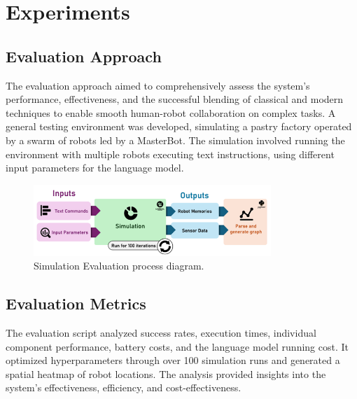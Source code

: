 \documentclass[pdflatex,sn-mathphys-num]{sn-jnl}%
\theoremstyle{thmstyleone}%
\theoremstyle{thmstyletwo}%
\theoremstyle{thmstylethree}%
\begin{document}
\section{Experiments}
\subsection{Evaluation Approach}
The evaluation approach aimed to comprehensively assess the system's performance, effectiveness, and the successful blending of classical and modern techniques to enable smooth human-robot collaboration on complex tasks. A general testing environment was developed, simulating a pastry factory operated by a swarm of robots led by a MasterBot. The simulation involved running the environment with multiple robots executing text instructions, using different input parameters for the language model.\cite{benjamin2007cognitive}
\begin{figure}[h]
\centering
\includegraphics[width=0.8\textwidth]{figures/Picture4.png}
\caption{Simulation Evaluation process diagram.}\label{fig10}
\end{figure}
\subsection{Evaluation Metrics}
The evaluation script analyzed success rates, execution times, individual component performance, battery costs, and the language model running cost. It optimized hyperparameters through over 100 simulation runs and generated a spatial heatmap of robot locations. The analysis provided insights into the system's effectiveness, efficiency, and cost-effectiveness.
\end{document}
